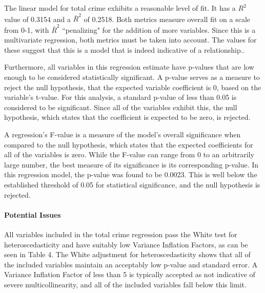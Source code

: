 \documentclass[12pt]{article}
\begin{document}
	The linear model for total crime exhibits a reasonable level of fit.  It has a $ R^{2} $ value of 0.3154 and a $ \bar{R}^{2} $ of 0.2518.  Both metrics measure overall fit on a scale from 0-1, with $ \bar{R}^{2} $ ``penalizing" for the addition of more variables.  Since this is a multivariate regression, both metrics must be taken into account.  The values for these suggest that this is a model that is indeed indicative of a relationship..
	
	\par
	
	Furthermore, all variables in this regression estimate have p-values that are low enough to be considered statistically significant.  A p-value serves as a measure to reject the null hypothesis, that the expected variable coefficient is 0, based on the variable's t-value.  For this analysis, a standard p-value of less than 0.05 is considered to be significant.  Since all of the variables exhibit this, the null hypothesis, which states that the coefficient is expected to be zero, is rejected.
	
	\par
	
	A regression's F-value is a measure of the model's overall significance when compared to the null hypothesis, which states that the expected coefficients for all of the variables is zero.  While the F-value can range from 0 to an arbitrarily large number, the best measure of its significance is its corresponding p-value.  In this regression model, the p-value was found to be 0.0023.  This is well below the established threshold of 0.05 for statistical significance, and the null hypothesis is rejected.

	\paragraph{Potential Issues}All variables included in the total crime regression pass the White test for heteroscedasticity and have suitably low Variance Inflation Factors, as can be seen in Table 4.  The White adjustment for heteroscedasticity shows that all of the included variables maintain an acceptably low p-value and standard error.  A Variance Inflation Factor of less than 5 is typically accepted as not indicative of severe multicollinearity, and all of the included variables fall below this limit.
\end{document}
